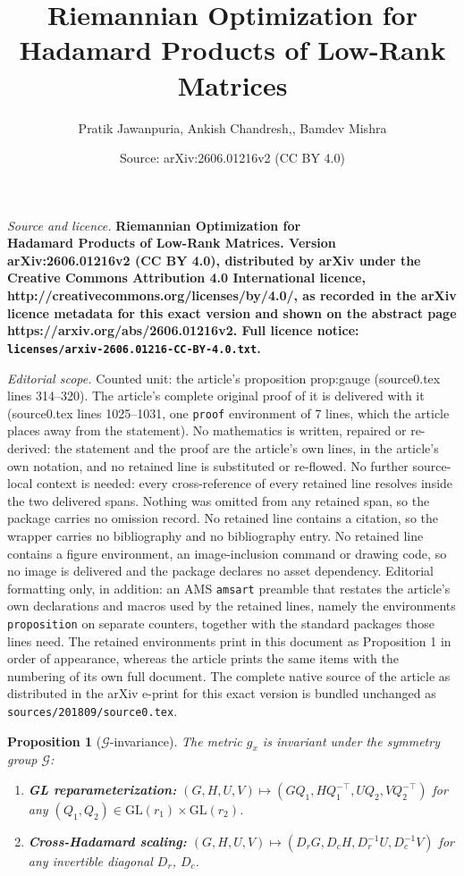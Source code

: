 \documentclass[10pt,a4paper]{amsart}
\title{\LARGE \bf Riemannian Optimization for\\Hadamard Products of Low-Rank Matrices}
\author{Pratik Jawanpuria, Ankish Chandresh,, Bamdev Mishra}
\date{Source: arXiv:2606.01216v2 (CC BY 4.0)}
\newtheorem{proposition}{Proposition}
\newcommand{\cG}{\mathcal{G}}
\begin{document}
\maketitle

\noindent\emph{Source and licence.} \LARGE \bf Riemannian Optimization for\\Hadamard Products of Low-Rank Matrices. Version arXiv:2606.01216v2 (CC BY 4.0), distributed by arXiv under the Creative Commons Attribution 4.0 International licence, http://creativecommons.org/licenses/by/4.0/, as recorded in the arXiv licence metadata for this exact version and shown on the abstract page https://arxiv.org/abs/2606.01216v2. Full licence notice: \texttt{licenses/arxiv-2606.01216-CC-BY-4.0.txt}.\par\smallskip

\noindent\textit{Editorial scope.} Counted unit: the article's proposition prop:gauge (source0.tex lines 314--320). The article's complete original proof of it is delivered with it (source0.tex lines 1025--1031, one \texttt{proof} environment of 7 lines, which the article places away from the statement). No mathematics is written, repaired or re-derived: the statement and the proof are the article's own lines, in the article's own notation, and no retained line is substituted or re-flowed.  No further source-local context is needed: every cross-reference of every retained line resolves inside the two delivered spans.  Nothing was omitted from any retained span, so the package carries no omission record.  No retained line contains a citation, so the wrapper carries no bibliography and no bibliography entry.  No retained line contains a figure environment, an image-inclusion command or drawing code, so no image is delivered and the package declares no asset dependency.  Editorial formatting only, in addition: an AMS \texttt{amsart} preamble that restates the article's own declarations and macros used by the retained lines, namely the environments \texttt{proposition} on separate counters, together with the standard packages those lines need.  The retained environments print in this document as Proposition 1 in order of appearance, whereas the article prints the same items with the numbering of its own full document.  The complete native source of the article as distributed in the arXiv e-print for this exact version is bundled unchanged as \texttt{sources/201809/source0.tex}.
\begin{proposition}[$\cG$-invariance]\label{prop:gauge}
The metric $g_x$ is invariant under the symmetry group $\cG$:
\begin{enumerate}[nosep,label=(\alph*)]
\item \textbf{GL reparameterization:} $(G,H,U,V)\mapsto(GQ_1, HQ_1^{-\top}, UQ_2, VQ_2^{-\top})$ for any $(Q_1,Q_2)\in\mathrm{GL}(r_1)\times\mathrm{GL}(r_2)$.
\item \textbf{Cross-Hadamard scaling:} $(G,H,U,V)\mapsto(D_rG, D_cH, D_r^{-1}U, D_c^{-1}V)$ for any invertible diagonal $D_r$, $D_c$.
\end{enumerate}
\end{proposition}
\end{document}
